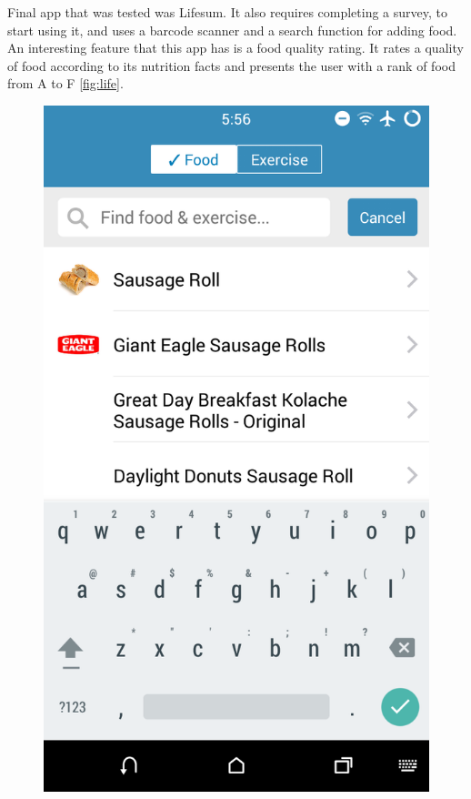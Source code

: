 Final app that was tested was Lifesum. It also requires completing a survey, to start using it, and uses a barcode scanner and a search function for adding food. An interesting feature that this app has is a food quality rating. It rates a quality of food according to its nutrition facts and presents the user with a rank of food from A to F \autoref{fig:life}.


\begin{figure}[!tbp]
  \centering
  \begin{minipage}[b]{0.4\textwidth}
    \includegraphics[width=\textwidth]{Figures/2/eat.png}

\end{minipage}
\end{figure}

